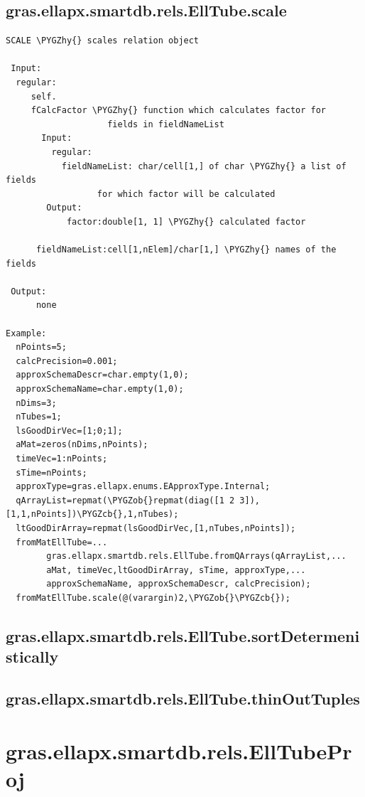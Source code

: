 \documentclass[letterpaper,10pt,english]{sphinxmanual}
\def\PYGZob{\char`\{}
\def\PYGZcb{\char`\}}
\def\PYGZhy{\char`\-}
\begin{document}
\subsection{gras.ellapx.smartdb.rels.EllTube.scale}
\label{chap_functions:gras-ellapx-smartdb-rels-elltube-scale}
\begin{Verbatim}[commandchars=\\\{\}]
SCALE \PYGZhy{} scales relation object

 Input:
  regular:
     self.
     fCalcFactor \PYGZhy{} function which calculates factor for
                    fields in fieldNameList
       Input:
         regular:
           fieldNameList: char/cell[1,] of char \PYGZhy{} a list of fields
                  for which factor will be calculated
        Output:
            factor:double[1, 1] \PYGZhy{} calculated factor

      fieldNameList:cell[1,nElem]/char[1,] \PYGZhy{} names of the fields

 Output:
      none

Example:
  nPoints=5;
  calcPrecision=0.001;
  approxSchemaDescr=char.empty(1,0);
  approxSchemaName=char.empty(1,0);
  nDims=3;
  nTubes=1;
  lsGoodDirVec=[1;0;1];
  aMat=zeros(nDims,nPoints);
  timeVec=1:nPoints;
  sTime=nPoints;
  approxType=gras.ellapx.enums.EApproxType.Internal;
  qArrayList=repmat(\PYGZob{}repmat(diag([1 2 3]),[1,1,nPoints])\PYGZcb{},1,nTubes);
  ltGoodDirArray=repmat(lsGoodDirVec,[1,nTubes,nPoints]);
  fromMatEllTube=...
        gras.ellapx.smartdb.rels.EllTube.fromQArrays(qArrayList,...
        aMat, timeVec,ltGoodDirArray, sTime, approxType,...
        approxSchemaName, approxSchemaDescr, calcPrecision);
  fromMatEllTube.scale(@(varargin)2,\PYGZob{}\PYGZcb{});
\end{Verbatim}


\subsection{gras.ellapx.smartdb.rels.EllTube.sortDetermenistically}
\label{chap_functions:gras-ellapx-smartdb-rels-elltube-sortdetermenistically}

\subsection{gras.ellapx.smartdb.rels.EllTube.thinOutTuples}
\label{chap_functions:gras-ellapx-smartdb-rels-elltube-thinouttuples}

\section{gras.ellapx.smartdb.rels.EllTubeProj}
\label{chap_functions:gras-ellapx-smartdb-rels-elltubeproj}
\end{document}
